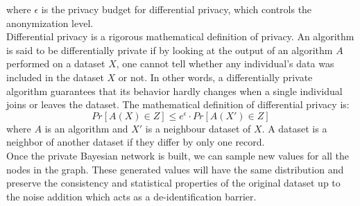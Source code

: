 where $\epsilon$ is the privacy budget for differential privacy, which controls the anonymization level. \\
Differential privacy is a rigorous mathematical definition of privacy. An algorithm is said to be differentially private if by looking at the output of an algorithm $A$ performed on a dataset $X$, one cannot tell whether any individual's data was included in the dataset $X$ or not. In other words, a differentially private algorithm guarantees that its behavior hardly changes when a single individual joins or leaves the dataset.
The mathematical definition of differential privacy is:
\begin{equation*}
    Pr[A(X) \in Z] \leq e^{\epsilon} \cdot Pr[A(X') \in Z]
\end{equation*}
where $A$ is an algorithm and $X'$ is a neighbour dataset of $X$. A dataset is a neighbor of another dataset if they differ by only one record. \\ 
Once the private Bayesian network is built, we can sample new values for all the nodes in the graph. These generated values will have the same distribution and preserve the consistency and statistical properties of the original dataset up to the noise addition which acts as a de-identification barrier. 
